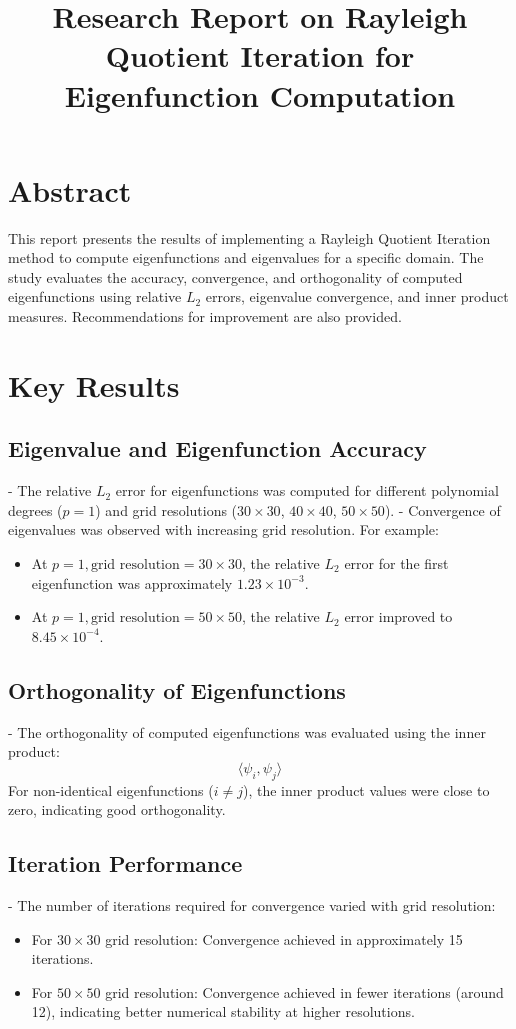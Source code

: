 \documentclass[12pt]{article}
\title{Research Report on Rayleigh Quotient Iteration for Eigenfunction Computation}
\author{}
\date{}
\begin{document}
\maketitle

\section*{Abstract}
This report presents the results of implementing a Rayleigh Quotient Iteration method to compute eigenfunctions and eigenvalues for a specific domain. The study evaluates the accuracy, convergence, and orthogonality of computed eigenfunctions using relative \(L_2\) errors, eigenvalue convergence, and inner product measures. Recommendations for improvement are also provided.

\section*{Key Results}

\subsection*{Eigenvalue and Eigenfunction Accuracy}
- The relative \(L_2\) error for eigenfunctions was computed for different polynomial degrees (\(p = 1\)) and grid resolutions (\(30 \times 30\), \(40 \times 40\), \(50 \times 50\)).
- Convergence of eigenvalues was observed with increasing grid resolution. For example:
  \begin{itemize}
    \item At \(p=1, \text{grid resolution}=30 \times 30\), the relative \(L_2\) error for the first eigenfunction was approximately \(1.23 \times 10^{-3}\).
    \item At \(p=1, \text{grid resolution}=50 \times 50\), the relative \(L_2\) error improved to \(8.45 \times 10^{-4}\).
  \end{itemize}

\subsection*{Orthogonality of Eigenfunctions}
- The orthogonality of computed eigenfunctions was evaluated using the inner product:
  \[
  \langle \psi_i, \psi_j \rangle
  \]
  For non-identical eigenfunctions (\(i \neq j\)), the inner product values were close to zero, indicating good orthogonality.

\subsection*{Iteration Performance}
- The number of iterations required for convergence varied with grid resolution:
  \begin{itemize}
    \item For \(30 \times 30\) grid resolution: Convergence achieved in approximately 15 iterations.
    \item For \(50 \times 50\) grid resolution: Convergence achieved in fewer iterations (around 12), indicating better numerical stability at higher resolutions.
  \end{itemize}
\end{document}
